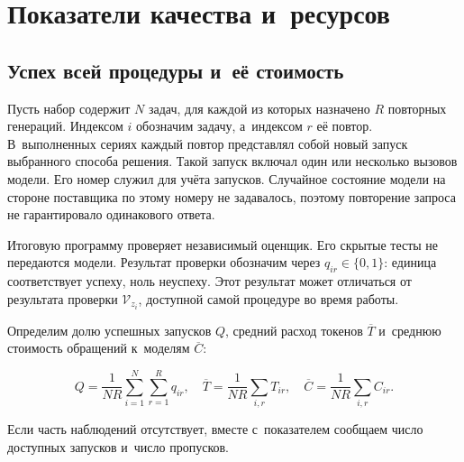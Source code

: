 \section{Показатели качества и~ресурсов}\label{sec:metrics}
\subsection{Успех всей процедуры и~её стоимость}
Пусть набор содержит $N$ задач, для каждой из которых назначено $R$ повторных генераций. Индексом $i$ обозначим задачу, а~индексом $r$ её повтор. В~выполненных сериях каждый повтор представлял собой новый запуск выбранного способа решения. Такой запуск включал один или несколько вызовов модели. Его номер служил для учёта запусков. Случайное состояние модели на стороне поставщика по этому номеру не задавалось, поэтому повторение запроса не гарантировало одинакового ответа.

Итоговую программу проверяет независимый оценщик. Его скрытые тесты не передаются модели. Результат проверки обозначим через $q_{ir}\in\{0,1\}$: единица соответствует успеху, ноль неуспеху. Этот результат может отличаться от результата проверки $\mathcal{V}_{z_i}$, доступной самой процедуре во время работы.

Определим долю успешных запусков $Q$, средний расход токенов $\overline{T}$ и~среднюю стоимость обращений к~моделям $\overline{C}$:
\begin{formulakey}
\begin{equation}
Q=\frac{1}{NR}\sum_{i=1}^{N}\sum_{r=1}^{R}q_{ir},\quad
\overline{T}=\frac{1}{NR}\sum_{i,r}T_{ir},\quad
\overline{C}=\frac{1}{NR}\sum_{i,r}C_{ir}.
\end{equation}
\begin{symbols}
\end{symbols}
\end{formulakey}
Если часть наблюдений отсутствует, вместе с~показателем сообщаем число доступных запусков и~число пропусков.

